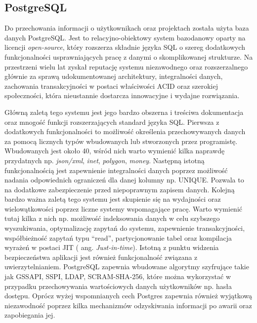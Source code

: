 \subsection{PostgreSQL}
\label{subsec:postgreSQL}
Do przechowania informacji o użytkownikach oraz projektach została użyta baza danych \mbox{PostgreSQL}. Jest to relacyjno-obiektowy system bazodanowy oparty na licencji \textit{open-source}, który rozszerza składnie języka SQL o szereg dodatkowych funkcjonalności usprawniających pracę z danymi o skomplikowanej strukturze\cite{POS01}. Na przestrzeni wielu lat zyskał reputację systemu niezawodnego oraz rozszerzalnego głównie za sprawą udokumentowanej architektury, integralności danych, zachowania transakcyjności w postaci właściwości ACID oraz szerokiej społeczności, która nieustannie dostarcza innowacyjne i wydajne rozwiązania.


Główną zaletą tego systemu jest jego bardzo obszerna i treściwa dokumentacja oraz mnogość funkcji rozszerzających standard języka SQL. Pierwsza z dodatkowych funkcjonalności to możliwość określenia przechowywanych danych za pomocą licznych typów wbudowanych lub stworzonych przez programistę. Wbudowanych jest około 40, wśród nich warto wymienić kilka naprawdę przydatnych np. \textit{json/xml}, \textit{inet}, \textit{polygon}, \textit{money}. Następną istotną funkcjonalnością jest zapewnienie integralności danych poprzez możliwość nadania odpowiednich ograniczeń dla danej kolumny np. UNIQUE. Pozwala to na dodatkowe zabezpieczenie przed niepoprawnym zapisem danych. Kolejną bardzo ważna zaletą tego systemu jest skupienie się na wydajności oraz wielowątkowości poprzez liczne systemy wspomagające pracę. Warto wymienić tutaj kilka z nich np. możliwość indeksowania danych w celu szybszego wyszukiwania, optymalizację zapytań do systemu, zapewnienie transakcyjności, współbieżność zapytań typu “read”, partycjonowanie tabel oraz kompilacja wyrażeń w postaci JIT ( ang. \textit{Just-in-time}). Istotną z punktu widzenia bezpieczeństwa aplikacji jest również funkcjonalność związana z uwierzytelnianiem. PostgreSQL zapewnia wbudowane algorytmy szyfrujące takie jak GSSAPI, SSPI, LDAP, SCRAM-SHA-256, które można wykorzystać w przypadku przechowywania wartościowych danych użytkowników np. hasła dostępu. Oprócz wyżej wspomnianych cech Postgres zapewnia również wyjątkową niezawodność poprzez kilka mechanizmów odzyskiwania informacji po awarii oraz zapobiegania jej.

